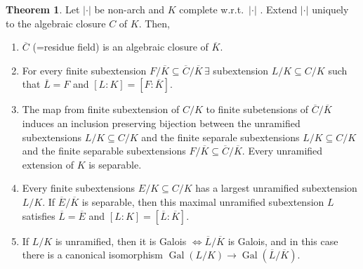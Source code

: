\documentclass[openany]{amsbook}
\numberwithin{section}{chapter}
\theoremstyle{definition}
\newtheorem{theorem}{Theorem}[chapter]
\begin{document}
\begin{theorem}
    Let \(\vert \cdot \vert \) be non-arch and \(K\) complete w.r.t.\ \(\vert \cdot \vert \) . Extend \(\vert \cdot  \vert \) uniquely to the algebraic closure \(C\) of \(K\). Then,
    
    \begin{enumerate}[label=\roman*)]
        \item \(\overline{C} \) (=residue field) is an algebraic closure of \(\overline{K}\).
        \item For every finite subextension \(F / \overline{K} \subseteq \overline{C} / \overline{K}\, \exists\) subextension \(L / K \subseteq C / K\) such that \(\overline{L} = F\) and \([L:K] = [F:\overline{K}]\).
        \item The map from finite subextension of \(C / K\) to finite subetensions of \(\overline{C} / \overline{K}\) induces an inclusion preserving bijection between the unramified subextensions \(L / K \subseteq C / K\) and the finite separale subextensions \(L / K \subseteq C / K\) and the finite separable subextensions \(F / \overline{K} \subseteq \overline{C} / \overline{K}\). Every unramified extension of \(K\) is separable.
        \item Every finite subextensions \(E / K \subseteq C / K\) has a largest unramified subextension \(L / K\). If \(\overline{E} / \overline{K}\) is separable, then this maximal unramified subextension \(L\) satisfies \(\overline{L} = \overline{E}\) and \([L:K] = [\overline{L}:\overline{K}]\).
        
        \item If \(L / K\) is unramified, then it is Galois \(\iff \overline{L} / \overline{K}\) is Galois, and in this case there is a canonical isomorphism \(\operatorname{Gal}(L / K) \to \operatorname{Gal}(\overline{L}/\overline{K})\).

    \end{enumerate} 
\end{theorem}
\end{document}
